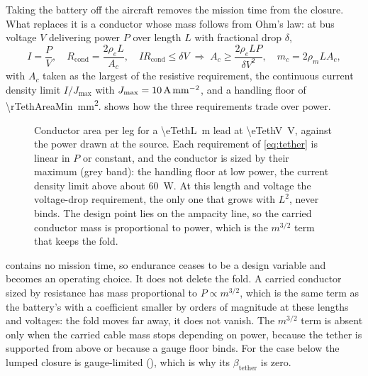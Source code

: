 Taking the battery off the aircraft removes the mission time from the closure.
What replaces it is a conductor whose mass follows from Ohm's law: at bus
voltage $V$ delivering power $P$ over length $L$ with fractional drop
$\delta$,
\begin{equation}
  I = \frac{P}{V},
  \quad
  R_{\mathrm{cond}} = \frac{2\rho_e L}{A_c},
  \quad
  IR_{\mathrm{cond}}\le\delta V
  \;\Longrightarrow\;
  A_c \ge \frac{2\rho_e L P}{\delta V^2},
  \quad
  m_c = 2\rho_m L A_c ,
  \label{eq:tether}
\end{equation}
with $A_c$ taken as the largest of the resistive requirement, the continuous
current density limit $I/J_{\max}$ with $J_{\max}=\SI{10}{\ampere\per\milli\metre\squared}$,
and a handling floor of \SI{\rTethAreaMin}{\milli\metre\squared}.
 shows how the three requirements trade over power.

\begin{figure}[tbp]
\centering

\caption{Conductor area per leg for a \SI{\eTethL}{\metre} lead at
\SI{\eTethV}{\volt}, against the power drawn at the source. Each requirement of
\cref{eq:tether} is linear in $P$ or constant, and the conductor is sized by
their maximum (grey band): the handling floor at low power, the current
density limit above about \SI{60}{\watt}. At this length and voltage the
voltage-drop requirement, the only one that grows with $L^2$, never binds.
The design point lies on the ampacity line, so the carried conductor mass is
proportional to power, which is the $m^{3/2}$ term that keeps the fold.}
\label{fig:tether}
\end{figure}

\begin{observation}
 contains no mission time, so endurance ceases to be a design
variable and becomes an operating choice. It does not delete the fold. A
carried conductor sized by resistance has mass proportional to $P\propto
m^{3/2}$, which is the same term as the battery's with a coefficient smaller by
orders of magnitude at these lengths and voltages: the fold moves far away, it
does not vanish. The $m^{3/2}$ term is absent only when the carried cable mass
stops depending on power, because the tether is supported from above or
because a gauge floor binds. For the case below the lumped closure is
gauge-limited (\rTethGaugeLimited), which is why its $\beta_{\mathrm{tether}}$
is zero.
\end{observation}

